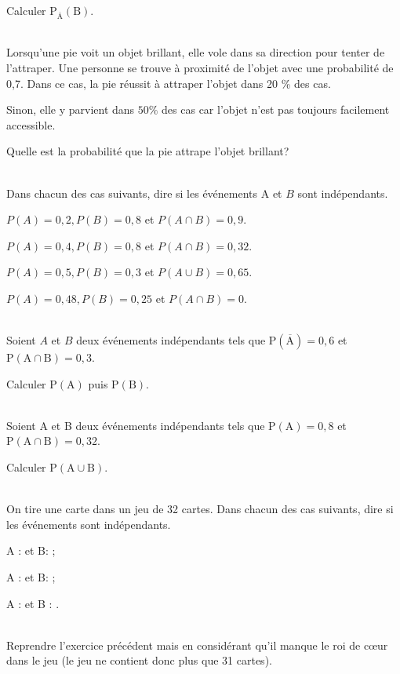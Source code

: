 \documentclass[11pt,a4paper]{article}  %
\begin{document}
Calculer $\mathrm{P}_{\overline{\mathrm{A}}}(\mathrm{B})$.

\exercice{}\\

Lorsqu'une pie voit un objet brillant, elle vole dans sa direction pour tenter de l'attraper. Une personne se trouve à proximité de l'objet avec une probabilité de 0,7. Dans ce cas, la pie réussit à attraper l'objet dans 20 \% des cas.

Sinon, elle y parvient dans $50 \%$ des cas car l'objet n'est pas toujours facilement accessible.

Quelle est la probabilité que la pie attrape l'objet brillant?

\exercice{}\\

Dans chacun des cas suivants, dire si les événements A et $B$ sont indépendants.
\begin{enumMet}
	\item $P(A)=0,2, P(B)=0,8$ et $P(A \cap B)=0,9$.
	\item $P(A)=0,4, P(B)=0,8$ et $P(A \cap B)=0,32$.
	\item $P(A)=0,5, P(B)=0,3$ et $P(A \cup B)=0,65$.
	\item $P(A)=0,48, P(B)=0,25$ et $P(A \cap B)=0$.
\end{enumMet}

\exercice{}\\
Soient $A$ et $B$ deux événements indépendants tels que $\mathrm{P}(\overline{\mathrm{A}})=0,6$ et $\mathrm{P}(\mathrm{A} \cap \mathrm{B})=0,3$.

Calculer $\mathrm{P}(\mathrm{A})$ puis $\mathrm{P}(\mathrm{B})$.

\exercice{}\\
Soient A et B deux événements indépendants tels que $\mathrm{P}(\mathrm{A})=0,8$ et $\mathrm{P}(\mathrm{A} \cap \mathrm{B})=0,32$.

Calculer $\mathrm{P}(\mathrm{A} \cup \mathrm{B})$.

\exercice{}\\
On tire une carte dans un jeu de 32 cartes. Dans chacun des cas suivants, dire si les événements sont indépendants.
\begin{enumMet}
	\item A :  et B: ;
	\item A :  et B:  ;
	\item A :  et B : .
\end{enumMet}

\exercice{}\\
Reprendre l'exercice précédent mais en considérant qu'il manque le roi de c\oe{}ur dans le jeu (le jeu ne contient donc plus que 31 cartes).
\end{document}
